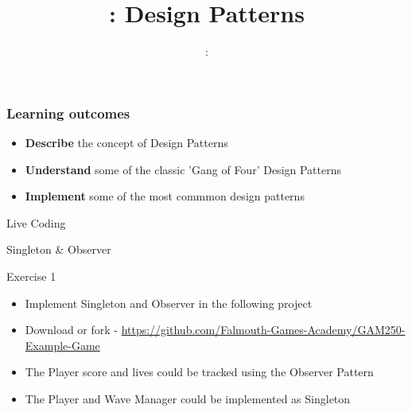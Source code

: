 \usepackage{../../beamerthemeFalmouthGamesAcademy}
\usepackage{multimedia}
\graphicspath{ {../../} }


\usepackage[normalem]{ulem}
\usepackage{wasysym}

\usepackage{pdfpages}

\usetikzlibrary{arrows,automata}




\title{\sessionnumber: Design Patterns}
\subtitle{\modulecode: \moduletitle}

\frame{\titlepage} 

\begin{frame}
	\frametitle{Learning outcomes}
	\begin{itemize}
		\item \textbf{Describe} the concept of Design Patterns
		\item \textbf{Understand} some of the classic 'Gang of Four' Design Patterns
		\item \textbf{Implement} some of the most commmon design patterns
	\end{itemize}
\end{frame}



\begin{frame}{Live Coding}
	\begin{center}
	Singleton \& Observer
	\end{center}
\end{frame}

\begin{frame}{Exercise 1}
	\begin{itemize}
		\item Implement Singleton and Observer in the following project
		\item Download or fork - \url{https://github.com/Falmouth-Games-Academy/GAM250-Example-Game}
		\item The Player score and lives could be tracked using the Observer Pattern
		\item The Player and Wave Manager could be implemented as Singleton 
	\end{itemize}
\end{frame}

